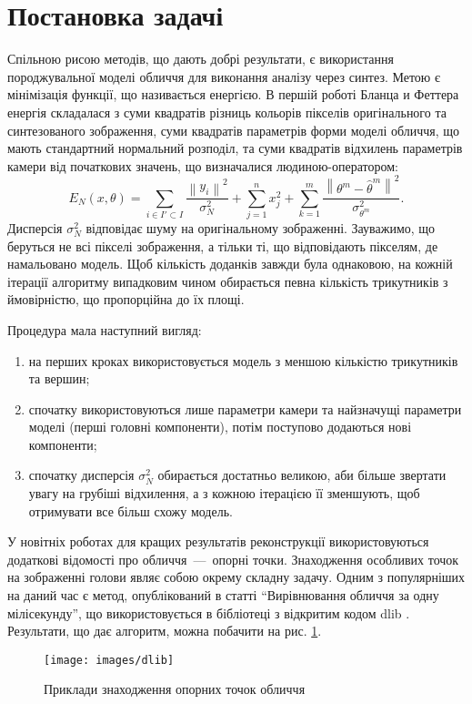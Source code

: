 \section{Постановка задачі}

Спільною рисою методів, що дають добрі результати,
є використання породжувальної моделі обличчя
для виконання аналізу через синтез.
Метою є мінімізація функції, що називається енергією.
В першій роботі Бланца и Феттера \cite{blanz:romdhani:vetter}
енергія складалася з
суми квадратів різниць кольорів пікселів
оригінального та синтезованого зображення,
суми квадратів параметрів форми моделі обличчя,
що мають стандартний нормальний розподіл,
та суми квадратів відхилень параметрів камери від початкових значень,
що визначалися людиною-оператором:
\begin{equation}\label{eq:energy:blanz}
  E_N\left( x, \theta \right)
  = \sum_{i \in I' \subset I}
      \frac{\left\| y_i \right\|^2}{\sigma^2_N}
  + \sum_{j = 1}^{n} x_j^2
  + \sum_{k = 1}^{m}
      \frac{\left\| \theta^m - \hat{\theta}^m \right\|^2}
           {\sigma^2_{\theta^m}}.
\end{equation}
Дисперсія $\sigma_N^2$ відповідає шуму на оригінальному зображенні.
Зауважимо, що беруться не всі пікселі зображення,
а тільки ті, що відповідають пікселям, де намальовано модель.
Щоб кількість доданків завжди була однаковою,
на кожній ітерації алгоритму випадковим чином
обирається певна кількість трикутників
з ймовірністю, що пропорційна до їх площі.

Процедура мала наступний вигляд:
\begin{enumerate}
  \item на перших кроках використовується модель
    з меншою кількістю трикутників та вершин;
  \item спочатку використовуються лише параметри камери
    та найзначущі параметри моделі (перші головні компоненти),
    потім поступово додаються нові компоненти;
  \item спочатку дисперсія $\sigma_N^2$ обирається достатньо великою,
    аби більше звертати увагу на грубіші відхилення,
    а з кожною ітерацією її зменшують,
    щоб отримувати все більш схожу модель.
\end{enumerate}

У новітніх роботах для кращих результатів реконструкції використовуються
додаткові відомості про обличчя~---~опорні точки.
Знаходження особливих точок на зображенні голови
являє собою окрему складну задачу.
Одним з популярніших на даний час є метод, опублікований в статті
``Вирівнювання обличчя за одну мілісекунду'',
що використовується в бібліотеці з відкритим кодом dlib \cite{Kazemi:2014}.
Результати, що дає алгоритм, можна побачити на рис. \ref{fig:problems:dlib}.
\begin{figure}[h]
  \centering
    \texttt{[image: images/dlib]}
  \caption{Приклади знаходження опорних точок обличчя}
  \label{fig:problems:dlib}
\end{figure}

